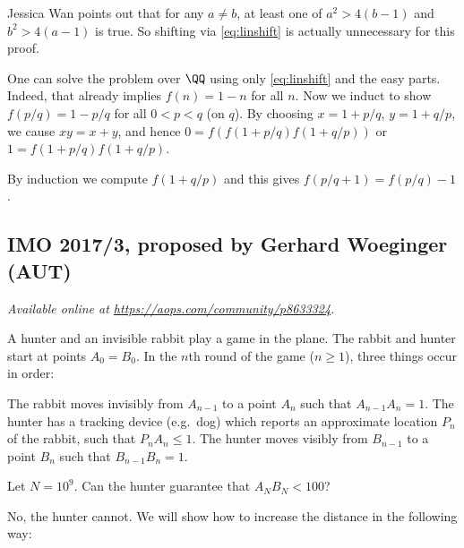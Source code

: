 \documentclass[11pt]{scrartcl}
\begin{document}
\begin{remark*}
  Jessica Wan points out that
  for any $a \neq b$, at least one of $a^2 > 4(b-1)$
  and $b^2 > 4(a-1)$ is true.
  So shifting via \eqref{eq:linshift}
  is actually unnecessary for this proof.
\end{remark*}

\begin{remark*}
  One can solve the problem over $\QQ$
  using only \eqref{eq:linshift} and the easy parts.
  Indeed, that already implies $f(n) = 1-n$ for all $n$.
  Now we induct to show $f(p/q) = 1-p/q$ for all $0 < p < q$ (on $q$).
  By choosing $x = 1+p/q$, $y = 1+q/p$,
  we cause $xy = x+y$,
  and hence $0 = f\left( f(1+p/q)f(1+q/p) \right)$
  or $1 = f(1+p/q)f(1+q/p)$.

  By induction we compute $f(1+q/p)$
  and this gives $f(p/q+1) = f(p/q)-1$.
\end{remark*}
\pagebreak

\subsection{IMO 2017/3, proposed by Gerhard Woeginger (AUT)}
\textsl{Available online at \url{https://aops.com/community/p8633324}.}
\begin{mdframed}[style=mdpurplebox,frametitle={Problem statement}]
A hunter and an invisible rabbit play a game in the plane.
The rabbit and hunter start at points $A_0 = B_0$.
In the $n$th round of the game ($n \ge 1$), three things occur in order:
\begin{enumerate}[(i)]
  \ii The rabbit moves invisibly from $A_{n-1}$ to a point $A_n$
  such that $A_{n-1} A_n = 1$.
  \ii The hunter has a tracking device (e.g.\ dog)
  which reports an approximate location $P_n$ of the rabbit,
  such that $P_n A_n \le 1$.
  \ii The hunter moves visibly from $B_{n-1}$ to a point $B_n$
  such that $B_{n-1} B_n = 1$.
\end{enumerate}
Let $N = 10^9$. Can the hunter guarantee that $A_N B_N < 100$?
\end{mdframed}
No, the hunter cannot.
We will show how to increase the distance in the following way:
\end{document}
